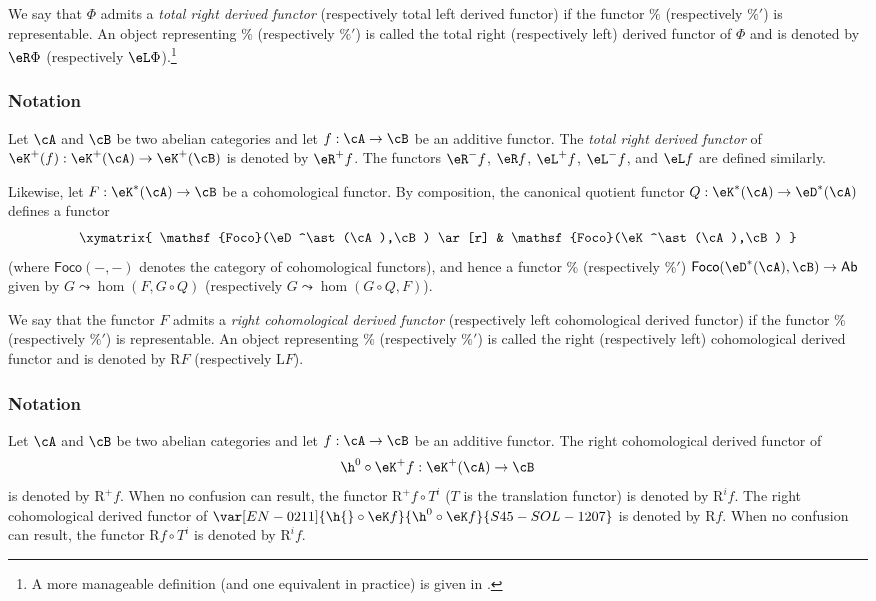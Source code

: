 \begin{definition}\label{VIII:4-1-2}
We say that $\Phi$ admits a \emph{total right derived functor}
(respectively total left derived functor) if the functor $\%$
(respectively $\%'$) is representable. An object representing $\%$
(respectively $\%'$) is called the total right (respectively left) derived
functor of $\Phi$ and is denoted by $\eR \Phi$ (respectively
$\eL \Phi$).\footnote{A more manageable definition (and one equivalent in
practice) is given in .}
\end{definition}

\subsubsection{Notation}\label{VIII:4-1-3}

Let $\cA$ and $\cB$ be two abelian categories and let $f:\cA\to \cB$ be
an additive functor. The \emph{total right derived functor} of
$\eK^+(f):\eK^+(\cA) \to \eK^+(\cB)$ is denoted by $\eR^+ f$. The
functors $\eR^- f$, $\eR f$, $\eL^+ f$, $\eL^- f$, and $\eL f$ are
defined similarly.

Likewise, let $F:\eK^\ast(\cA) \to \cB$ be a cohomological functor.
By composition, the canonical quotient functor
$Q:\eK^\ast(\cA) \to \eD^\ast(\cA)$ defines a functor
\[\xymatrix{
  \mathsf{Foco}(\eD^\ast(\cA),\cB) \ar[r]
    & \mathsf{Foco}(\eK^\ast(\cA),\cB)
}\]
(where $\mathsf{Foco}(-,-)$ denotes the category of cohomological
functors), and hence a functor $\%$ (respectively $\%'$)
$\mathsf{Foco}(\eD^\ast(\cA),\cB) \to \mathsf{Ab}$ given by
$G\leadsto \hom(F,G\circ Q)$ (respectively
$G\leadsto \hom(G\circ Q,F)$).

\begin{definition}\label{VIII:4-1-4}
We say that the functor $F$ admits a \emph{right cohomological derived
functor} (respectively left cohomological derived functor) if the functor
$\%$ (respectively $\%'$) is representable. An object representing $\%$
(respectively $\%'$) is called the right (respectively left)
cohomological derived functor and is denoted by $\mathrm{R} F$ (respectively
$\mathrm{L} F$).
\end{definition}

\subsubsection{Notation}\label{VIII:4-1-5}

Let $\cA$ and $\cB$ be two abelian categories and let $f:\cA\to \cB$ be
an additive functor. The right cohomological derived functor of
\[
  \h^0{}\circ \eK^+ f:\eK^+(\cA) \to \cB
\]
is denoted by $\mathrm{R}^+ f$. When no confusion can result, the functor
$\mathrm{R}^+ f\circ T^i$ ($T$ is the translation functor) is denoted by
$\mathrm{R}^i f$. The right cohomological derived functor of
$\var[EN-0211]{\h{}\circ \eK f}{\h^0{}\circ \eK f}{S45-SOL-1207}$ is denoted by $\mathrm{R} f$. When no confusion can result,
the functor $\mathrm{R} f\circ T^i$ is denoted by $\mathrm{R}^i f$.

